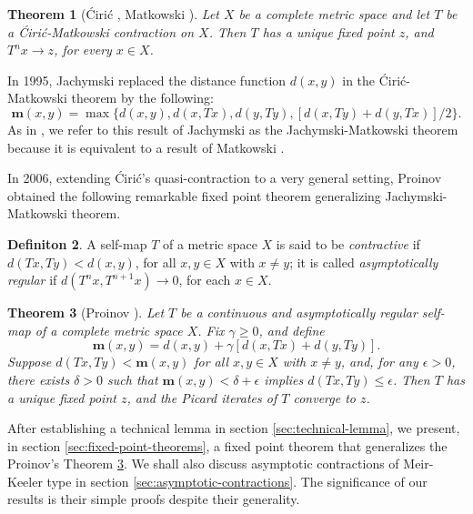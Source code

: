 \documentclass[a4paper,10pt,twoside,reqno]{amsart}
\newtheorem{thm}{Theorem}[section]
\theoremstyle{definition}
\newtheorem{dfn}[thm]{Definiton}
\theoremstyle{remark}
\newcommand{\set}[1]{\{#1\}}
\newcommand{\ga}{\gamma}
\newcommand{\de}{\delta}
\newcommand{\e}{\epsilon}
\newcommand{\m}{\mathbf{m}}
\numberwithin{equation}{section}
\begin{document}
\begin{thm}[\'Ciri\'c \cite{Ciric-1981}, Matkowski \cite{Kuczma}]
\label{thm:Ciric-Matkowski}
  Let $X$ be a complete metric space and let $T$ be a \'Ciri\'c-Matkowski contraction
  on $X$. Then $T$ has a unique fixed point $z$, and $T^nx\to z$, for every $x\in X$.
\end{thm}

In 1995, Jachymski \cite[Theorem 2]{Jachymski-1995} replaced the distance function $d(x, y)$ in
the \'Ciri\'c-Matkowski theorem by the following:
\begin{equation*}%
  \m(x, y) = \max \set{d(x, y), d(x, T x), d(y, Ty), [d(x, Ty) + d(y, T x)]/2}.
\end{equation*}
As in \cite{Proinov-2006}, we refer to this result of Jachymski as
the Jachymski-Matkowski theorem because it is equivalent to a result
of Matkowski \cite[Theorem 1]{Matkowski-1980}.

In 2006, extending \'Ciri\'c's quasi-contraction to a very general setting,
Proinov \cite{Proinov-2006} obtained the following remarkable fixed point theorem
generalizing Jachymski-Matkowski theorem.

\begin{dfn}
\label{dfn:contractive+asymptotically-regular}
  A self-map $T$ of a metric space $X$ is said to be
  \emph{contractive} \cite{Edelstein-62} if $d(Tx, Ty) < d(x,y)$,
  for all $x,y\in X$ with $x \neq y$; it is called
  \emph{asymptotically regular} \cite{Browder-1966} if
  $d(T^nx, T^{n+1}x)\to0$, for each $x\in X$.
\end{dfn}

\begin{thm}[Proinov \cite{Proinov-2006}]
\label{thm:Proinov}
  Let $T$ be a continuous and asymptotically regular self-map
  of a complete metric space $X$. Fix $\ga\geq0$, and define
  \begin{equation}\label{eqn:Proinov-m(x,y)}
    \m(x,y) = d(x, y) + \ga[d(x, T x) + d(y, Ty)].
  \end{equation}
  Suppose $d(Tx, Ty) < \m(x, y)$ for all $x, y\in X$ with $x\neq y$,
  and, for any $\e>0$, there exists $\de>0$ such that $\m(x, y) < \de+\e$
  implies $d(T x, Ty)\leq \e$.
  Then $T$ has a unique fixed point $z$, and the Picard iterates of $T$
  converge to $z$.
\end{thm}

After establishing a technical lemma in section \ref{sec:technical-lemma},
we present, in section \ref{sec:fixed-point-theorems}, a fixed point theorem
that generalizes the Proinov's Theorem \ref{thm:Proinov}.
We shall also discuss asymptotic contractions of Meir-Keeler type
in section \ref{sec:asymptotic-contractions}. The significance
of our results is their simple proofs despite their generality.
\end{document}
